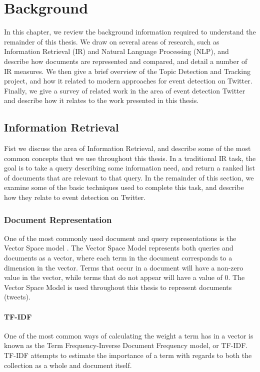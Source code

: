 
\newpage
\chapter{Background}
\label{chapter:background}

In this chapter, we review the background information required to understand the remainder of this thesis.
We draw on several areas of research, such as Information Retrieval (IR) and Natural Language Processing (NLP), and describe how documents are represented and compared, and detail a number of IR measures.
We then give a brief overview of the Topic Detection and Tracking project, and how it related to modern approaches for event detection on Twitter.
Finally, we give a survey of related work in the area of event detection Twitter and describe how it relates to the work presented in this thesis.


\section{Information Retrieval}
Fist we discuss the area of Information Retrieval, and describe some of the most common concepts that we use throughout this thesis.
In a traditional IR task, the goal is to take a query describing some information need, and return a ranked list of documents that are relevant to that query.
In the remainder of this section, we examine some of the basic techniques used to complete this task, and describe how they relate to event detection on Twitter.

\subsection{Document Representation}

One of the most commonly used document and query representations is the Vector Space model \citep{salton1975vector}. The Vector Space Model represents both queries and documents as a vector, where each term in the document corresponds to a dimension in the vector.
Terms that occur in a document will have a non-zero value in the vector, while terms that do not appear will have a value of 0.
The Vector Space Model is used throughout this thesis to represent documents (tweets).

\subsubsection{TF-IDF}
One of the most common ways of calculating the weight a term has in a vector is known as the Term Frequency-Inverse Document Frequency model, or TF-IDF.
TF-IDF attempts to estimate the importance of a term with regards to both the collection as a whole and document itself.

